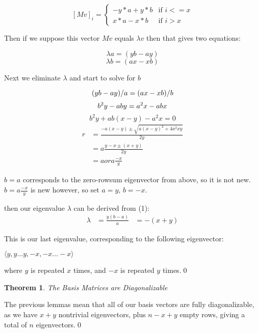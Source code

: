 \documentclass[10pt,a4paper]{report}
\newtheorem{theorem}{Theorem}
\begin{document}
\[ {[Mv]}_i = \begin{cases}
	-y*a + y*b & \text{if } i <= x\\
	x*a - x*b & \text{if } i > x
\end{cases} \]

Then if we suppose this vector $Mv$ equals $\lambda v$ then that gives two
equations:

\begin{equation}
	\lambda a = (yb - ay)
\end{equation}
\begin{equation*}
	\lambda b = (ax - xb)
\end{equation*}

Next we eliminate $\lambda$ and start to solve for $b$

\begin{equation*}
	(yb - ay)/a = (ax - xb)/b\\
\end{equation*}
\begin{equation*}
	b^2y - aby = a^2x - abx\\
\end{equation*}
\begin{equation*}
	b^2y + ab(x - y) - a^2x = 0
\end{equation*}
\begin{align*}
	r &= \frac{-a(x-y) \pm \sqrt{{a(x-y)}^2 + 4a^2xy}}{2y}\\
	  &= a\frac{y - x \pm (x + y)}{2y}\\
	  &= a or a\frac{-x}{y}
\end{align*}

$b = a$ corresponds to the zero-rowsum eigenvector from above, so it is not
new.
$b = a\frac{-x}{y}$ is new however, so set $a = y$, $b = -x$.

then our eigenvalue $\lambda$ can be derived from (1):
\begin{align*}
	\lambda &= \frac{y(b - a)}{a}
			&= -(x + y)
\end{align*}

This is our last eigenvalue, corresponding to the following eigenvector:

$\langle y, y\ldots y, -x, -x\ldots -x\rangle$

where $y$ is repeated $x$ times, and $-x$ is repeated $y$ times.\qed

\begin{theorem} The Basis Matrices are Diagonalizable \end{theorem}

The previous lemmas mean that all of our basis vectors are fully
diagonalizable, as we have $x+y$ nontrivial eigenvectors, plus $n-x+y$ empty
rows, giving a total of $n$ eigenvectors.\qed
\end{document}
